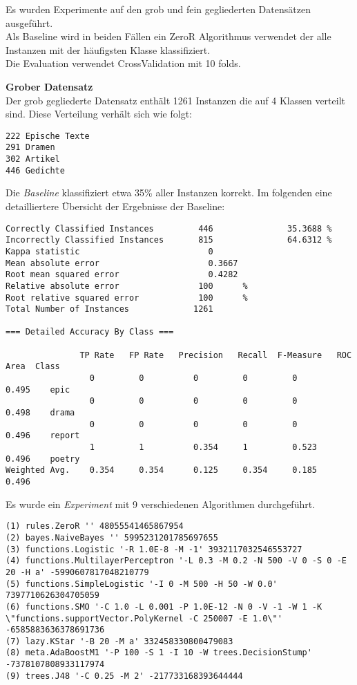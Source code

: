 \documentclass[]{article}
\begin{document}
Es wurden Experimente auf den grob und fein gegliederten Datensätzen
ausgeführt.\\
Als Baseline wird in beiden Fällen ein ZeroR Algorithmus verwendet der
alle Instanzen mit der häufigsten Klasse klassifiziert.\\
Die Evaluation verwendet CrossValidation mit 10 folds.

\textbf{Grober Datensatz}\\
Der grob gegliederte Datensatz enthält 1261 Instanzen die auf 4 Klassen
verteilt sind. Diese Verteilung verhält sich wie folgt:

\begin{verbatim}
222 Epische Texte
291 Dramen
302 Artikel
446 Gedichte
\end{verbatim}

Die \emph{Baseline} klassifiziert etwa 35\% aller Instanzen korrekt. Im
folgenden eine detailliertere Übersicht der Ergebnisse der Baseline:

\begin{verbatim}
Correctly Classified Instances         446               35.3688 %
Incorrectly Classified Instances       815               64.6312 %
Kappa statistic                          0     
Mean absolute error                      0.3667
Root mean squared error                  0.4282
Relative absolute error                100      %
Root relative squared error            100      %
Total Number of Instances             1261     

=== Detailed Accuracy By Class ===

               TP Rate   FP Rate   Precision   Recall  F-Measure   ROC Area  Class
                 0         0          0         0         0          0.495    epic
                 0         0          0         0         0          0.498    drama
                 0         0          0         0         0          0.496    report
                 1         1          0.354     1         0.523      0.496    poetry
Weighted Avg.    0.354     0.354      0.125     0.354     0.185      0.496
\end{verbatim}

Es wurde ein \emph{Experiment} mit 9 verschiedenen Algorithmen
durchgeführt.

\begin{verbatim}
(1) rules.ZeroR '' 48055541465867954
(2) bayes.NaiveBayes '' 5995231201785697655
(3) functions.Logistic '-R 1.0E-8 -M -1' 3932117032546553727
(4) functions.MultilayerPerceptron '-L 0.3 -M 0.2 -N 500 -V 0 -S 0 -E 20 -H a' -5990607817048210779
(5) functions.SimpleLogistic '-I 0 -M 500 -H 50 -W 0.0' 7397710626304705059
(6) functions.SMO '-C 1.0 -L 0.001 -P 1.0E-12 -N 0 -V -1 -W 1 -K \"functions.supportVector.PolyKernel -C 250007 -E 1.0\"' -6585883636378691736
(7) lazy.KStar '-B 20 -M a' 332458330800479083
(8) meta.AdaBoostM1 '-P 100 -S 1 -I 10 -W trees.DecisionStump' -7378107808933117974
(9) trees.J48 '-C 0.25 -M 2' -217733168393644444
\end{verbatim}
\end{document}
